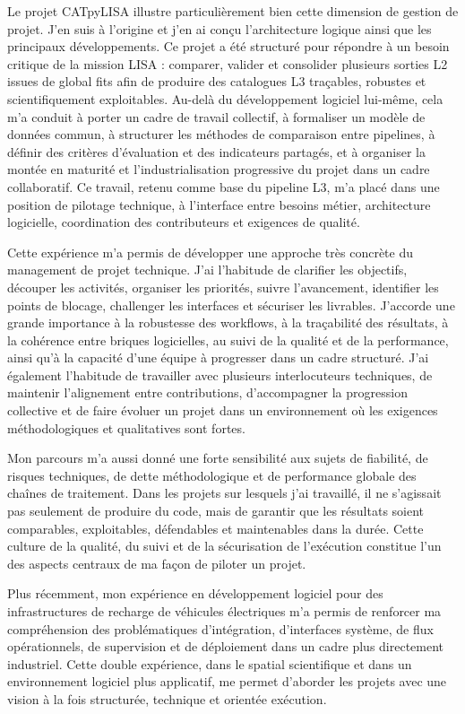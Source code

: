 \documentclass[11pt,a4paper]{altacv}
\begin{document}
{Le projet CATpyLISA illustre particulièrement bien cette dimension de gestion de projet. J'en suis à l'origine et j'en ai conçu l'architecture logique ainsi que les principaux développements. Ce projet a été structuré pour répondre à un besoin critique de la mission LISA : comparer, valider et consolider plusieurs sorties L2 issues de global fits afin de produire des catalogues L3 traçables, robustes et scientifiquement exploitables. Au-delà du développement logiciel lui-même, cela m'a conduit à porter un cadre de travail collectif, à formaliser un modèle de données commun, à structurer les méthodes de comparaison entre pipelines, à définir des critères d'évaluation et des indicateurs partagés, et à organiser la montée en maturité et l'industrialisation progressive du projet dans un cadre collaboratif. Ce travail, retenu comme base du pipeline L3, m'a placé dans une position de pilotage technique, à l'interface entre besoins métier, architecture logicielle, coordination des contributeurs et exigences de qualité.

Cette expérience m'a permis de développer une approche très concrète du management de projet technique. J'ai l'habitude de clarifier les objectifs, découper les activités, organiser les priorités, suivre l'avancement, identifier les points de blocage, challenger les interfaces et sécuriser les livrables. J'accorde une grande importance à la robustesse des workflows, à la traçabilité des résultats, à la cohérence entre briques logicielles, au suivi de la qualité et de la performance, ainsi qu'à la capacité d'une équipe à progresser dans un cadre structuré. J'ai également l'habitude de travailler avec plusieurs interlocuteurs techniques, de maintenir l'alignement entre contributions, d'accompagner la progression collective et de faire évoluer un projet dans un environnement où les exigences méthodologiques et qualitatives sont fortes.

Mon parcours m'a aussi donné une forte sensibilité aux sujets de fiabilité, de risques techniques, de dette méthodologique et de performance globale des chaînes de traitement. Dans les projets sur lesquels j'ai travaillé, il ne s'agissait pas seulement de produire du code, mais de garantir que les résultats soient comparables, exploitables, défendables et maintenables dans la durée. Cette culture de la qualité, du suivi et de la sécurisation de l'exécution constitue l'un des aspects centraux de ma façon de piloter un projet.

Plus récemment, mon expérience en développement logiciel pour des infrastructures de recharge de véhicules électriques m'a permis de renforcer ma compréhension des problématiques d'intégration, d'interfaces système, de flux opérationnels, de supervision et de déploiement dans un cadre plus directement industriel. Cette double expérience, dans le spatial scientifique et dans un environnement logiciel plus applicatif, me permet d'aborder les projets avec une vision à la fois structurée, technique et orientée exécution.

}
\end{document}
